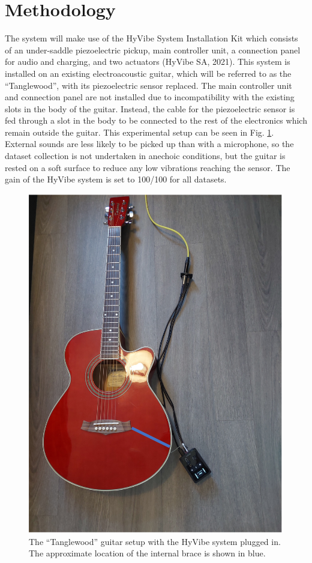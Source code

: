 \documentclass[conference]{IEEEtran}
\begin{document}
\section{Methodology}
The system will make use of the HyVibe System Installation Kit which consists of an under-saddle piezoelectric pickup, main controller unit, a connection panel for audio and charging, and two actuators (HyVibe SA, 2021).
This system is installed on an existing electroacoustic guitar, which will be referred to as the ``Tanglewood'', with its piezoelectric sensor replaced. The main controller unit and connection panel are not installed due to incompatibility with the existing slots in
the body of the guitar. Instead, the cable for the piezoelectric sensor is fed through a slot in the body to be connected to the rest of the electronics which remain outside the guitar. This experimental setup can be
seen in Fig. \ref{tanglewood-setup}. External sounds are less likely to be picked up than with a microphone, so the dataset collection is not undertaken in anechoic conditions, but the guitar is rested on a soft surface to reduce any low
vibrations reaching the sensor. The gain of the HyVibe system is set to 100/100 for all datasets.

\begin{figure}[htbp]
    \centerline{\includegraphics[scale=0.4]{tanglewood-setup.png}}
    \caption{The ``Tanglewood'' guitar setup with the HyVibe system plugged in. The approximate location of the internal brace is shown in blue.}
    \label{tanglewood-setup}
    \end{figure}
\end{document}
